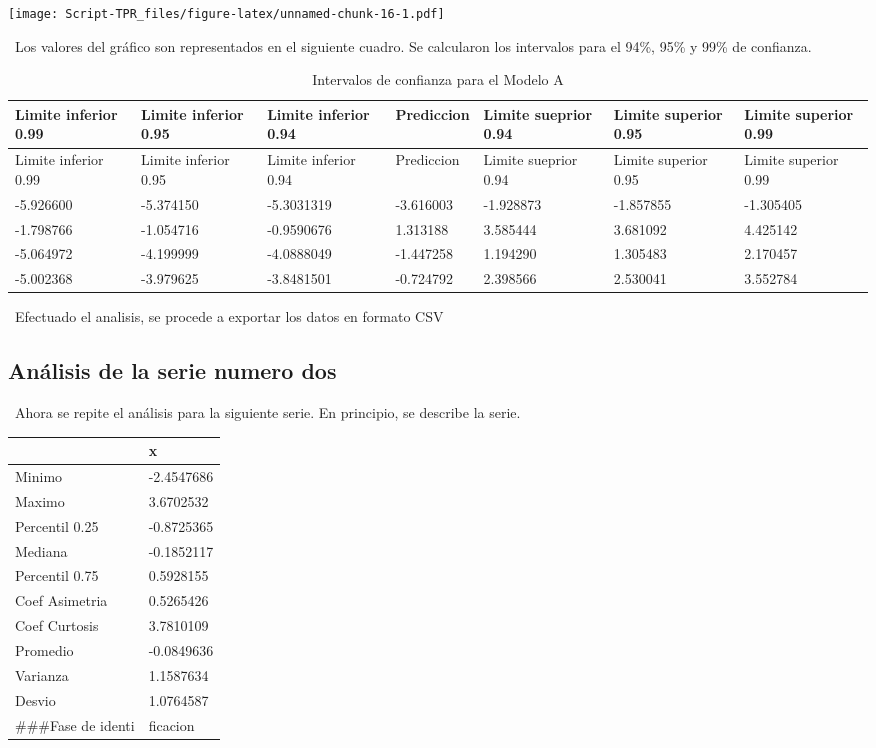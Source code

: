 \documentclass[]{article}
\newenvironment{Shaded}{\begin{snugshade}}{\end{snugshade}}
\newcommand{\DataTypeTok}[1]{\textcolor[rgb]{0.13,0.29,0.53}{#1}}
\newcommand{\DecValTok}[1]{\textcolor[rgb]{0.00,0.00,0.81}{#1}}
\newcommand{\KeywordTok}[1]{\textcolor[rgb]{0.13,0.29,0.53}{\textbf{#1}}}
\newcommand{\NormalTok}[1]{#1}
\newcommand{\OperatorTok}[1]{\textcolor[rgb]{0.81,0.36,0.00}{\textbf{#1}}}
\newcommand{\StringTok}[1]{\textcolor[rgb]{0.31,0.60,0.02}{#1}}
\begin{document}
\texttt{[image: Script-TPR\_files/figure-latex/unnamed-chunk-16-1.pdf]}

~Los valores del gráfico son representados en el siguiente cuadro. Se
calcularon los intervalos para el 94\%, 95\% y 99\% de confianza.

\begin{longtable}[]{@{}lllllll@{}}
\caption{Intervalos de confianza para el Modelo A}\tabularnewline
\toprule
Limite inferior 0.99 & Limite inferior 0.95 & Limite inferior 0.94 &
Prediccion & Limite sueprior 0.94 & Limite superior 0.95 & Limite
superior 0.99\tabularnewline
\midrule
\endfirsthead
\toprule
Limite inferior 0.99 & Limite inferior 0.95 & Limite inferior 0.94 &
Prediccion & Limite sueprior 0.94 & Limite superior 0.95 & Limite
superior 0.99\tabularnewline
\midrule
\endhead
-5.926600 & -5.374150 & -5.3031319 & -3.616003 & -1.928873 & -1.857855 &
-1.305405\tabularnewline
-1.798766 & -1.054716 & -0.9590676 & 1.313188 & 3.585444 & 3.681092 &
4.425142\tabularnewline
-5.064972 & -4.199999 & -4.0888049 & -1.447258 & 1.194290 & 1.305483 &
2.170457\tabularnewline
-5.002368 & -3.979625 & -3.8481501 & -0.724792 & 2.398566 & 2.530041 &
3.552784\tabularnewline
\bottomrule
\end{longtable}

~Efectuado el analisis, se procede a exportar los datos en formato CSV

\begin{Shaded}
\end{Shaded}

\hypertarget{analisis-de-la-serie-numero-dos}{%
\subsection{Análisis de la serie numero
dos}\label{analisis-de-la-serie-numero-dos}}

~Ahora se repite el análisis para la siguiente serie. En principio, se
describe la serie.

\begin{longtable}[]{@{}ll@{}}
\toprule
& x\tabularnewline
\midrule
\endhead
Minimo & -2.4547686\tabularnewline
Maximo & 3.6702532\tabularnewline
Percentil 0.25 & -0.8725365\tabularnewline
Mediana & -0.1852117\tabularnewline
Percentil 0.75 & 0.5928155\tabularnewline
Coef Asimetria & 0.5265426\tabularnewline
Coef Curtosis & 3.7810109\tabularnewline
Promedio & -0.0849636\tabularnewline
Varianza & 1.1587634\tabularnewline
Desvio & 1.0764587\tabularnewline
\#\#\#Fase de identi & ficacion\tabularnewline
\bottomrule
\end{longtable}
\end{document}
